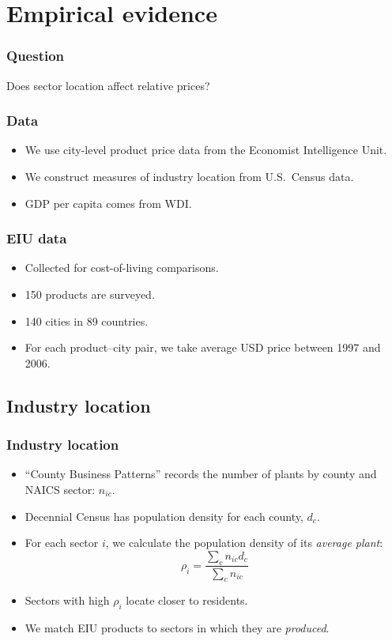 \documentclass[compress,mathserif]{beamer}
\newcounter{perc}
\newcounter{percek}
\renewcommand{\time}[1]{\addtocounter{percek}{#1}}
\begin{document}
\section{Empirical evidence}

\begin{frame}\frametitle{Question}
Does sector location affect relative prices?
\end{frame}

\begin{frame}\frametitle{Data}
\begin{itemize}
\item We use city-level product price data from the Economist Intelligence Unit.
\item We construct measures of industry location from U.S.~Census data.
\item GDP per capita comes from WDI.
\end{itemize}
\end{frame}

\begin{frame}\frametitle{EIU data}
\begin{itemize}
\item Collected for cost-of-living comparisons.
\item 150 products are surveyed.
\item 140 cities in 89 countries.
\item For each product--city pair, we take average USD price between 1997 and 2006.
\end{itemize}
\end{frame}
\time 4

\subsection{Industry location}
\begin{frame}\frametitle{Industry location}
\begin{itemize}
\item ``County Business Patterns'' records the number of plants by county and NAICS sector: $n_{ic}$.
\item Decennial Census has population density for each county, $d_c$.
\item For each sector $i$, we calculate the population density of its \emph{average plant}:
\[
\rho_i = \frac{\sum_c n_{ic} d_c}{\sum_c n_{ic} }
\]
\item Sectors with high $\rho_i$ locate closer to residents.
\item We match EIU products to sectors in which they are \emph{produced}.
\end{itemize}
\end{frame}
\end{document}
